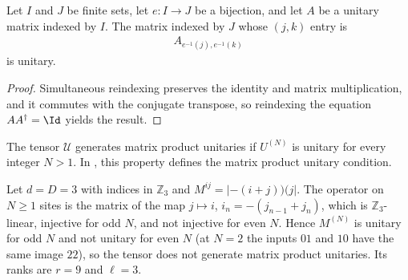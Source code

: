 \begin{lemma}
    \label{thm:mpu_reindex_unitary}
    \leanok
    Let $I$ and $J$ be finite sets, let $e\colon I\to J$ be a bijection, and
    let $A$ be a unitary matrix indexed by $I$.  The matrix indexed by $J$
    whose $(j,k)$ entry is
    \begin{align}
        A_{e^{-1}(j),e^{-1}(k)}
    \end{align}
    is unitary.
\end{lemma}

\begin{proof}\leanok
    Simultaneous reindexing preserves the identity and matrix multiplication,
    and it commutes with the conjugate transpose, so reindexing the equation
    $AA^\dagger=\Id$ yields the result.
\end{proof}

\begin{definition}
    \label{def:mpu}
    \leanok
    The tensor $\mathcal U$ generates matrix product unitaries if $U^{(N)}$ is
    unitary for every integer $N>1$.  In \cite[Section~III, equation~(10)]{Cirac2017MPU}, this property defines the matrix product unitary
    condition.
\end{definition}

\begin{example}
    \label{ex:mpu_odd_ring_tensor}
    \leanok
    Let $d=D=3$ with indices in $\mathbb Z_3$ and $M^{ij}=|{-(i+j)})(j|$. The
    operator on $N\geq1$ sites is the matrix of the map $j\mapsto i$,
    $i_n=-(j_{n-1}+j_n)$, which is $\mathbb Z_3$-linear, injective for odd $N$, and
    not injective for even $N$. Hence $M^{(N)}$ is unitary for odd $N$ and not
    unitary for even $N$ (at $N=2$ the inputs $01$ and $10$ have the same image
    $22$), so the tensor does not generate matrix product unitaries.
    Its ranks are $r=9$ and $\ell=3$.
\end{example}


